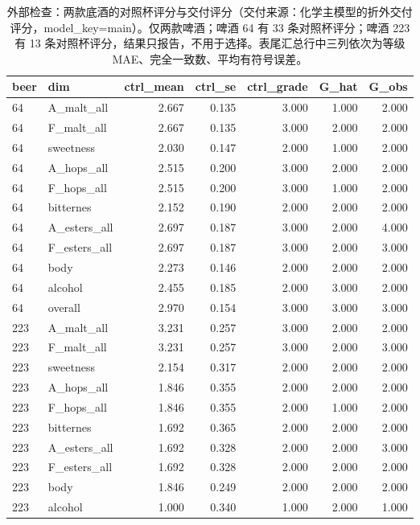 \begin{table}[htbp]
\centering
\caption{外部检查：两款底酒的对照杯评分与交付评分（交付来源：化学主模型的折外交付评分，model\_key=main）。仅两款啤酒；啤酒 64 有 33 条对照杯评分；啤酒 223 有 13 条对照杯评分，结果只报告，不用于选择。表尾汇总行中三列依次为等级 MAE、完全一致数、平均有符号误差。}\label{tab:q1_external}
\begin{tabular}{llrrrrr}
\toprule
beer & dim & ctrl\_mean & ctrl\_se & ctrl\_grade & G\_hat & G\_obs \\
\midrule
64 & A\_malt\_all & 2.667 & 0.135 & 3.000 & 1.000 & 2.000 \\
64 & F\_malt\_all & 2.667 & 0.135 & 3.000 & 2.000 & 2.000 \\
64 & sweetness & 2.030 & 0.147 & 2.000 & 1.000 & 2.000 \\
64 & A\_hops\_all & 2.515 & 0.200 & 3.000 & 2.000 & 2.000 \\
64 & F\_hops\_all & 2.515 & 0.200 & 3.000 & 1.000 & 2.000 \\
64 & bitternes & 2.152 & 0.190 & 2.000 & 2.000 & 2.000 \\
64 & A\_esters\_all & 2.697 & 0.187 & 3.000 & 2.000 & 4.000 \\
64 & F\_esters\_all & 2.697 & 0.187 & 3.000 & 2.000 & 3.000 \\
64 & body & 2.273 & 0.146 & 2.000 & 2.000 & 2.000 \\
64 & alcohol & 2.455 & 0.185 & 2.000 & 3.000 & 2.000 \\
64 & overall & 2.970 & 0.154 & 3.000 & 3.000 & 3.000 \\
223 & A\_malt\_all & 3.231 & 0.257 & 3.000 & 2.000 & 2.000 \\
223 & F\_malt\_all & 3.231 & 0.257 & 3.000 & 2.000 & 3.000 \\
223 & sweetness & 2.154 & 0.317 & 2.000 & 2.000 & 2.000 \\
223 & A\_hops\_all & 1.846 & 0.355 & 2.000 & 2.000 & 2.000 \\
223 & F\_hops\_all & 1.846 & 0.355 & 2.000 & 1.000 & 2.000 \\
223 & bitternes & 1.692 & 0.365 & 2.000 & 2.000 & 2.000 \\
223 & A\_esters\_all & 1.692 & 0.328 & 2.000 & 2.000 & 3.000 \\
223 & F\_esters\_all & 1.692 & 0.328 & 2.000 & 2.000 & 2.000 \\
223 & body & 1.846 & 0.249 & 2.000 & 2.000 & 2.000 \\
223 & alcohol & 1.000 & 0.340 & 1.000 & 2.000 & 1.000 \\

\end{tabular}
\end{table}
